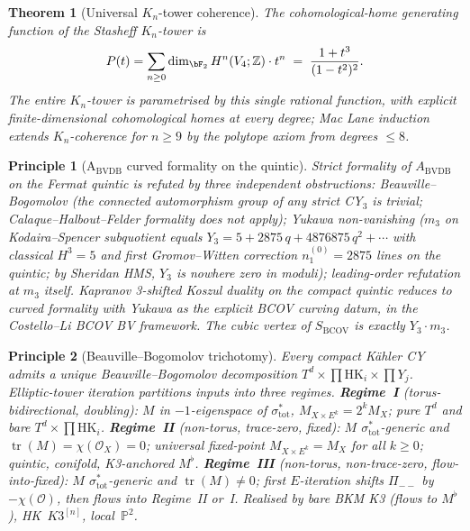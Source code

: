 \documentclass[11pt]{article}
\providecommand{\cO}{\mathcal{O}}
\providecommand{\bZ}{\mathbb{Z}}
\providecommand{\bP}{\mathbb{P}}
\newtheorem{theorem}{Theorem}[section]
\newtheorem*{principle}{Principle}
\begin{document}
\begin{theorem}[Universal $K_n$-tower coherence]
The cohomological-home generating function of the Stasheff $K_n$-tower
is
\[
P(t) = \sum_{n\ge 0}\dim_{\bF_2}H^n(V_4;\bZ)\cdot t^n
\;=\; \frac{1+t^3}{(1-t^2)^2}.
\]
The entire $K_n$-tower is parametrised by this single rational
function, with explicit finite-dimensional cohomological homes at
every degree; Mac Lane induction extends $K_n$-coherence for
$n\ge 9$ by the polytope axiom from degrees $\le 8$.
\end{theorem}

\begin{principle}[A$_{\mathrm{BVDB}}$ curved formality on the quintic]
Strict formality of $A_{\mathrm{BVDB}}$ on the Fermat quintic is
refuted by three independent obstructions: Beauville--Bogomolov
\textup{(}the connected automorphism group of any strict CY$_3$ is
trivial; Calaque--Halbout--Felder formality does not apply\textup{)};
Yukawa non-vanishing \textup{(}$m_3$ on Kodaira--Spencer subquotient
equals $Y_3 = 5 + 2875\,q + 4876875\,q^2 + \cdots$ with classical
$H^3 = 5$ and first Gromov--Witten correction
$n_1^{(0)} = 2875$ lines on the quintic; by Sheridan HMS, $Y_3$ is
nowhere zero in moduli\textup{)}; leading-order refutation at $m_3$
itself. Kapranov 3-shifted Koszul duality on the compact quintic
reduces to \emph{curved} formality with Yukawa as the explicit BCOV
curving datum, in the Costello--Li BCOV BV framework. The cubic
vertex of $S_{\mathrm{BCOV}}$ is exactly $Y_3\cdot m_3$.
\end{principle}

\begin{principle}[Beauville--Bogomolov trichotomy]
Every compact K\"ahler CY admits a unique Beauville--Bogomolov
decomposition $T^d\times\prod\mathrm{HK}_i\times\prod Y_j$.
Elliptic-tower iteration partitions inputs into three regimes.
\textbf{Regime~I} \textup{(}torus-bidirectional, doubling\textup{)}:
$M$ in $-1$-eigenspace of $\sigma_{\mathrm{tot}}^{*}$, $M_{X\times E^k}
= 2^k M_X$; pure $T^d$ and bare $T^d\times\prod\mathrm{HK}_i$.
\textbf{Regime~II} \textup{(}non-torus, trace-zero, fixed\textup{)}:
$M$ $\sigma_{\mathrm{tot}}^{*}$-generic and
$\operatorname{tr}(M) = \chi(\cO_X) = 0$; universal fixed-point
$M_{X\times E^k} = M_X$ for all $k\ge 0$; quintic,
conifold, K3-anchored $M^{\flat}$. \textbf{Regime~III}
\textup{(}non-torus, non-trace-zero, flow-into-fixed\textup{)}:
$M$ $\sigma_{\mathrm{tot}}^{*}$-generic and
$\operatorname{tr}(M)\ne 0$; first $E$-iteration shifts
$\Pi_{--}$ by $-\chi(\cO)$, then flows into Regime~II or~I.
Realised by bare BKM K3 \textup{(}flows to $M^{\flat}$\textup{)},
HK~$K3^{[n]}$, local~$\bP^2$.
\end{principle}
\end{document}
